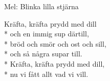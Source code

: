 \begin{SongText}
    \begin{SongInfo}
        Mel: Blinka lilla stjärna
    \end{SongInfo}
    \begin{SongVerse}
        Kräfta, kräfta prydd med dill\\*%
        och en immig sup därtill,\\*%
        bröd och smör och ost och sill,\\*%
        och så några supar till.\\*%
        Kräfta, kräfta prydd med dill,\\*%
        nu vi fått allt vad vi vill.
    \end{SongVerse}
\end{SongText}
